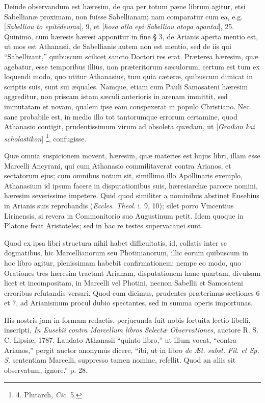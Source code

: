 Deinde
observandum est hæresim, de qua per totum pæne librum agitur, etsi
Sabellianæ proximam, non fuisse Sabellianam; nam comparatur cum ea,
e.g. [\emph{Sabelliou to epit\={e}deuma}], 9, et [\emph{hosa alla epi
Sabelliou atopa apantai}], 25. Quinimo, cum hæresis hæresi
apponitur in fine § 3, de Arianis aperta mentio est, ut mos est
Athanasii, de Sabellianis autem non est mentio, sed de iis qui ``Sabellizant,''
quibuscum scilicet sancto Doctori res erat. Præterea hæresim, quæ
agebatur, esse temporibus illius, non præteritorum sæculorum, certum
est tum ex loquendi modo, quo utitur Athanasius, tum quia cæteræ,
quibuscum dimicat in scriptis suis, sunt sui æquales. Namque, etiam
cum Pauli Samosateni hæresim aggreditur, non priscam istam sæculi
anterioris in arenam immittit, sed immutatam et novam, qualem ipse eam
conspexerat in populo Christiano. Nec sane probabile est, in medio
illo tot tantorumque errorum certamine, quod Athanasio contigit,
prudentissimum virum ad obsoleta quædam, ut [\emph{Graikon kai
scholastikon}] \footnote{4.
Plutarch, \emph{Cic}. 5.},
confugisse.

Quæ
omnia suspicionem movent, hæresim, quæ materies est hujus libri,
illam esse Marcelli Ancyrani, qui cum Athanasio commilitaverat contra
Arianos, et sectatorum ejus; cum omnibus notum sit, simillimo illo
Apollinaris exemplo, Athanasium id ipsum facere in disputationibus
suis, hæresiarchæ parcere nomini, hæresim severissime impetere.
Quid quod similiter a nominibus abstinet Eusebius in Arianis suis
reprobandis (\emph{Eccles}. \emph{Theol}. i. 9, 10); silet porro
Vincentius Lirinensis, si revera in Commonitorio suo Augustinum petit.
Idem quoque in Platone fecit Aristoteles; sed in hac re testes
supervacanei sunt.

Quod
ex ipsa libri structura nihil habet difficultatis, id, collatis inter
se dogmatibus, hic Marcellianorum seu Photinianorum, illic eorum
quibuscum in hoc libro agitur, plenissimam habebit confirmationem;
nempe eo modo, quo Orationes tres hæresim tractant Arianam,
disputationem hanc quartam, divulsam licet et incompositam, in Marcelli
vel Photini, necnon Sabellii et Samosateni erroribus refutandis
versari. Quod cum dicimus, prudentes præterimus sectiones 6 et 7, ad
Arianismum procul dubio spectantes, sed in summa operis importunas.

His
nostris jam in formam redactis, perjucunda fuit nobis fortuita lectio
libelli, inscripti, \emph{In Eusebii contra Marcellum libros Selectæ
Observationes}, auctore R. S. C. Lipsiæ, 1787. Laudato Athanasii ``quinto
libro,'' ut illum vocat, ``contra Arianos,'' pergit auctor anonymus
dicere, ``ibi, ut in libro \emph{de Æt. subst. Fil. et Sp. S.}
sententiam Marcelli, suppresso tamen nomine, refellit. Quod an aliis
sit observatum, ignore.'' p. 28.


